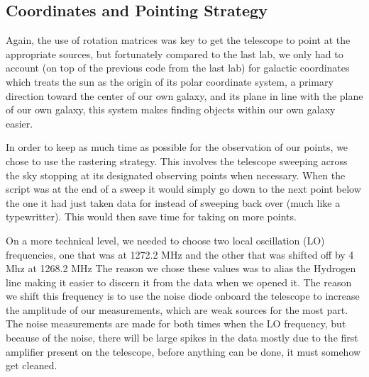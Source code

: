 \documentclass[12 pt]{article}
\begin{document}
\subsection*{Coordinates and Pointing Strategy}
Again, the use of rotation matrices was key to get the telescope to
point at the appropriate sources, but fortunately compared to the last
lab, we only had to account (on top of the previous code from the last
lab) for galactic coordinates which treats the sun as the origin of its
polar coordinate system, a primary direction toward the center
of our own galaxy, and its plane in line with the plane of our own
galaxy, this system makes finding objects within our own galaxy easier. \par
In order to keep as much time as possible for the observation of our
points, we chose to use the rastering strategy. This involves the
telescope sweeping across the sky stopping at its designated observing
points when necessary. When the script was at the end of a sweep it
would simply go down to the next point below the one it had just taken
data for instead of sweeping back over (much like a typewritter). This would then save time for
taking on more points. \par
On a more technical level, we needed to choose two local oscillation
(LO) frequencies, one that was at 1272.2 MHz and the other that was
shifted off by 4 Mhz at 1268.2 MHz The reason we chose these values was
to alias the Hydrogen line making it easier to discern it from the data
when we opened it. The reason we shift this frequency is
to use the noise diode onboard the telescope to increase the amplitude
of our measurements, which are weak sources for the most part. The noise
measurements are made for both times when the LO frequency, but because
of the noise, there will be large spikes in the data mostly due to the
first amplifier present on the telescope, before anything can be done,
it must somehow get cleaned.  
\end{document}

